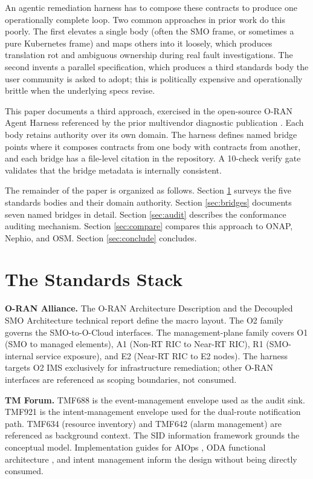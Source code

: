 \documentclass[twocolumn,10pt,a4paper]{article}
\begin{document}
An agentic remediation harness has to compose these contracts to produce one operationally complete loop. Two common approaches in prior work do this poorly. The first elevates a single body (often the SMO frame, or sometimes a pure Kubernetes frame) and maps others into it loosely, which produces translation rot and ambiguous ownership during real fault investigations. The second invents a parallel specification, which produces a third standards body the user community is asked to adopt; this is politically expensive and operationally brittle when the underlying specs revise.

This paper documents a third approach, exercised in the open-source O-RAN Agent Harness referenced by the prior multivendor diagnostic publication \cite{multivendor_blog_2026}. Each body retains authority over its own domain. The harness defines named bridge points where it composes contracts from one body with contracts from another, and each bridge has a file-level citation in the repository. A 10-check verify gate validates that the bridge metadata is internally consistent.

The remainder of the paper is organized as follows. Section \ref{sec:stack} surveys the five standards bodies and their domain authority. Section \ref{sec:bridges} documents seven named bridges in detail. Section \ref{sec:audit} describes the conformance auditing mechanism. Section \ref{sec:compare} compares this approach to ONAP, Nephio, and OSM. Section \ref{sec:conclude} concludes.

\section{The Standards Stack}
\label{sec:stack}

\textbf{O-RAN Alliance.} The O-RAN Architecture Description \cite{oran_wg1_arch} and the Decoupled SMO Architecture technical report \cite{oran_decoupled_smo} define the macro layout. The O2 family \cite{oran_o2_ganp,oran_o2_ims,oran_o2_dms} governs the SMO-to-O-Cloud interfaces. The management-plane family covers O1 \cite{oran_o1} (SMO to managed elements), A1 \cite{oran_a1} (Non-RT RIC to Near-RT RIC), R1 \cite{oran_r1} (SMO-internal service exposure), and E2 \cite{oran_e2} (Near-RT RIC to E2 nodes). The harness targets O2 IMS exclusively for infrastructure remediation; other O-RAN interfaces are referenced as scoping boundaries, not consumed.

\textbf{TM Forum.} TMF688 \cite{tmf688} is the event-management envelope used as the audit sink. TMF921 \cite{tmf921} is the intent-management envelope used for the dual-route notification path. TMF634 \cite{tmf634} (resource inventory) and TMF642 \cite{tmf642} (alarm management) are referenced as background context. The SID information framework \cite{tmf_gb922} grounds the conceptual model. Implementation guides for AIOps \cite{tmf_ig1228}, ODA functional architecture \cite{tmf_ig1190}, and intent management \cite{tmf_ig1253} inform the design without being directly consumed.
\end{document}
